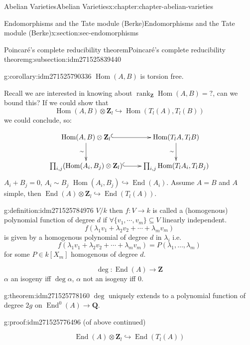 \documentclass[oneside,10pt,]{book}
\numberwithin{equation}{section}
\newcommand{\lb}{[}
\newcommand{\rb}{]}
\newcommand{\ZZ}{\mathbf{Z}}
\newcommand{\QQ}{\mathbf{Q}}
\DeclareMathOperator{\End}{End}
\DeclareMathOperator{\Hom}{Hom}
\DeclareMathOperator{\rank}{rank}
\begin{document}
\begin{chapterptx}{Abelian Varieties}{}{Abelian Varieties}{}{}{x:chapter:chapter-abelian-varieties}
\begin{sectionptx}{Endomorphisms and the Tate module (Berke)}{}{Endomorphisms and the Tate module (Berke)}{}{}{x:section:sec-endomorphisms}
\begin{subsectionptx}{Poincaré's complete reducibility theorem}{}{Poincaré's complete reducibility theorem}{}{}{g:subsection:idm271525839440}
\begin{corollary}{}{}{g:corollary:idm271525790336}
\(\Hom(A,B)\) is torsion free.%
\end{corollary}
Recall we are interested in knowing about \(\rank_\ZZ\Hom(A,B) = ?\), can we bound this? If we could show that%
\begin{equation*}
\Hom(A,B) \otimes \ZZ_l \hookrightarrow \Hom(T_l(A),T_l(B))
\end{equation*}
we could conclude, so:%
\par
%
\begin{equation*}
\xymatrix{
\Hom(A,B)\otimes \ZZ_l \ar[d]_{\sim} \ar@{^(->}[r]     & \Hom(T_lA,T_lB)\ar[d]_{\sim} \\
\prod_{i,j} (\Hom(A_i, B_j) \otimes \ZZ_l) \ar@{^(->}[r] & \prod_{i,j}\Hom(T_lA_i, T_l B_j)
}
\end{equation*}
\(A_i + B_j = 0\), \(A_i\sim B_j\) \(\Hom(A_i, B_j) \hookrightarrow \End(A_i)\). Assume \(A= B\) and \(A\) simple, then \(\End(A) \otimes \ZZ_l \hookrightarrow \End(T_l(A))\).%
\begin{definition}{}{g:definition:idm271525784976}%
\(V/k\) then \(f\colon V \to k\) is called a (homogenous) polynomial function of degree \(d\) if \(\forall \{v_1,\cdots, v_m\}\subseteq V\) linearly independent.%
\begin{equation*}
f(\lambda_1 v_1 + \lambda_2 v_2 +\cdots + \lambda_m v_m)
\end{equation*}
is given by a homogenous polynomial of degree \(d\) in \(\lambda_i\) i.e.%
\begin{equation*}
f(\lambda_1 v_1 + \lambda_2 v_2 +\cdots + \lambda_m v_m) = P(\lambda_1,\ldots, \lambda_m)
\end{equation*}
for some \(P\in k\lb X_m\rb\) homogenous of degree \(d\).%
\end{definition}
%
\begin{equation*}
\deg\colon \End(A) \to \ZZ
\end{equation*}
\(\alpha\) an isogeny iff \(\deg \alpha\), \(\alpha\) not an isogeny iff \(0\).%
\begin{theorem}{}{}{g:theorem:idm271525778160}%
\(\deg\) uniquely extends to a polynomial function of degree \(2g\) on \(\End^0(A) \to \QQ\).%
\end{theorem}
\begin{proofptx}{}{g:proof:idm271525776496}
(of above continued)%
\par
%
\begin{equation*}
\End(A) \otimes \ZZ_l \hookrightarrow\End(T_l(A))
\end{equation*}

\end{proofptx}
\end{subsectionptx}
\end{sectionptx}
\end{chapterptx}
\end{document}
